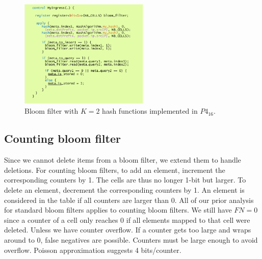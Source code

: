 \documentclass[11pt,oneside,a4paper]{article}
\begin{document}
\begin{figure}[hb]
	\centering
	\includegraphics[width=0.55\textwidth,scale=1]{figures/bloom_filter_p4}
	\caption{Bloom filter with $K = 2$ hash functions implemented in $P4_{16}$. \cite{advnet}}
	\label{fig:bloom_filter_p4}
\end{figure}

\subsection{Counting bloom filter}

Since we cannot delete items from a bloom filter, we extend them to handle deletions. For counting bloom filters, to add an element, increment the corresponding counters by 1. The cells are thus no longer 1-bit but larger. To delete an element, decrement the corresponding counters by 1. An element is considered in the table if all counters are larger than 0. All of our prior analysis for standard bloom filters applies to counting bloom filters. We still have $FN = 0$ since a counter of a cell only reaches 0 if all elements mapped to that cell were deleted. Unless we have counter overflow. If a counter gets too large and wraps around to 0, false negatives are possible. Counters must be large enough to avoid overflow. Poisson approximation suggests 4 bits/counter.
\end{document}
